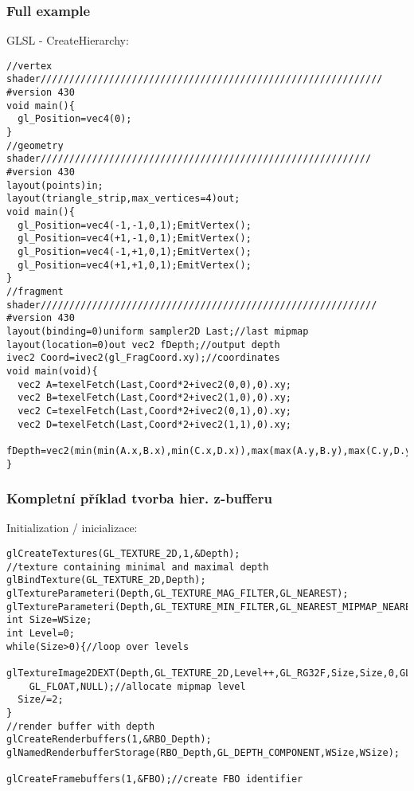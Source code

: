 \begin{frame}[fragile]\frametitle{Full example}\tiny
		GLSL - CreateHierarchy:
\begin{verbatim}
//vertex shader////////////////////////////////////////////////////////////
#version 430
void main(){
  gl_Position=vec4(0);
}
//geometry shader//////////////////////////////////////////////////////////
#version 430
layout(points)in;
layout(triangle_strip,max_vertices=4)out;
void main(){
  gl_Position=vec4(-1,-1,0,1);EmitVertex();
  gl_Position=vec4(+1,-1,0,1);EmitVertex();
  gl_Position=vec4(-1,+1,0,1);EmitVertex();
  gl_Position=vec4(+1,+1,0,1);EmitVertex();
}
//fragment shader///////////////////////////////////////////////////////////
#version 430
layout(binding=0)uniform sampler2D Last;//last mipmap
layout(location=0)out vec2 fDepth;//output depth
ivec2 Coord=ivec2(gl_FragCoord.xy);//coordinates
void main(void){
  vec2 A=texelFetch(Last,Coord*2+ivec2(0,0),0).xy;
  vec2 B=texelFetch(Last,Coord*2+ivec2(1,0),0).xy;
  vec2 C=texelFetch(Last,Coord*2+ivec2(0,1),0).xy;
  vec2 D=texelFetch(Last,Coord*2+ivec2(1,1),0).xy;
  fDepth=vec2(min(min(A.x,B.x),min(C.x,D.x)),max(max(A.y,B.y),max(C.y,D.y)));
}
\end{verbatim}
\end{frame}

\begin{frame}[fragile]\frametitle{Kompletní příklad tvorba hier. z-bufferu}\scriptsize
		Initialization / inicializace:
\begin{verbatim}
glCreateTextures(GL_TEXTURE_2D,1,&Depth);
//texture containing minimal and maximal depth
glBindTexture(GL_TEXTURE_2D,Depth);
glTextureParameteri(Depth,GL_TEXTURE_MAG_FILTER,GL_NEAREST);
glTextureParameteri(Depth,GL_TEXTURE_MIN_FILTER,GL_NEAREST_MIPMAP_NEAREST);
int Size=WSize;
int Level=0;
while(Size>0){//loop over levels
  glTextureImage2DEXT(Depth,GL_TEXTURE_2D,Level++,GL_RG32F,Size,Size,0,GL_RG,
    GL_FLOAT,NULL);//allocate mipmap level
  Size/=2;
}
//render buffer with depth
glCreateRenderbuffers(1,&RBO_Depth);
glNamedRenderbufferStorage(RBO_Depth,GL_DEPTH_COMPONENT,WSize,WSize);

glCreateFramebuffers(1,&FBO);//create FBO identifier
\end{verbatim}
\end{frame}


